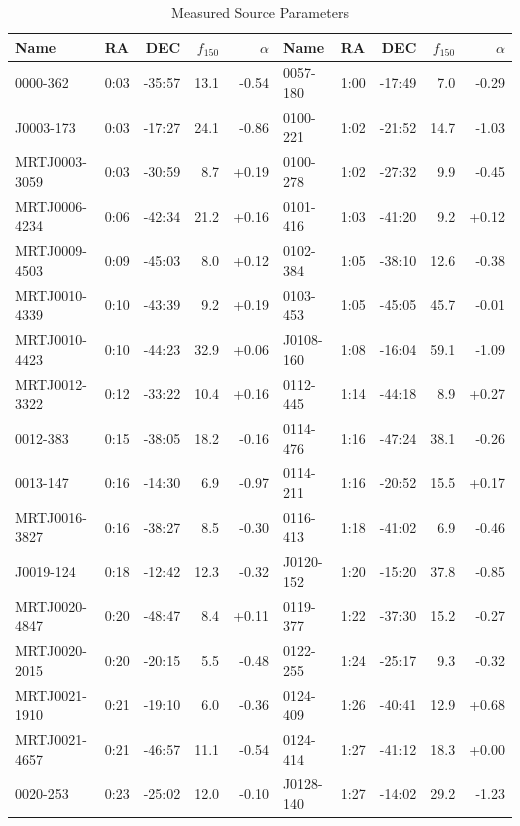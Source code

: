 \documentclass[preprint]{aastex}
\begin{document}
\begin{table}[ht]
\caption{Measured Source Parameters}
\begin{tabular}{l|lrrr||l|lrrr}
\hline
Name & RA & DEC & $f_{150}$ & $\alpha$ & Name & RA & DEC & $f_{150}$ & $\alpha$
\\
\hline
  0000-362 &  0:03 & -35:57 &   13.1 & -0.54 &   0057-180 &  1:00 & -17:49 &    7.0 & -0.29 \\
 J0003-173 &  0:03 & -17:27 &   24.1 & -0.86 &   0100-221 &  1:02 & -21:52 &   14.7 & -1.03 \\
MRTJ0003-3059 &  0:03 & -30:59 &    8.7 & +0.19 &   0100-278 &  1:02 & -27:32 &    9.9 & -0.45 \\
MRTJ0006-4234 &  0:06 & -42:34 &   21.2 & +0.16 &   0101-416 &  1:03 & -41:20 &    9.2 & +0.12 \\
MRTJ0009-4503 &  0:09 & -45:03 &    8.0 & +0.12 &   0102-384 &  1:05 & -38:10 &   12.6 & -0.38 \\
MRTJ0010-4339 &  0:10 & -43:39 &    9.2 & +0.19 &   0103-453 &  1:05 & -45:05 &   45.7 & -0.01 \\
MRTJ0010-4423 &  0:10 & -44:23 &   32.9 & +0.06 &  J0108-160 &  1:08 & -16:04 &   59.1 & -1.09 \\
MRTJ0012-3322 &  0:12 & -33:22 &   10.4 & +0.16 &   0112-445 &  1:14 & -44:18 &    8.9 & +0.27 \\
  0012-383 &  0:15 & -38:05 &   18.2 & -0.16 &   0114-476 &  1:16 & -47:24 &   38.1 & -0.26 \\
  0013-147 &  0:16 & -14:30 &    6.9 & -0.97 &   0114-211 &  1:16 & -20:52 &   15.5 & +0.17 \\
MRTJ0016-3827 &  0:16 & -38:27 &    8.5 & -0.30 &   0116-413 &  1:18 & -41:02 &    6.9 & -0.46 \\
 J0019-124 &  0:18 & -12:42 &   12.3 & -0.32 &  J0120-152 &  1:20 & -15:20 &   37.8 & -0.85 \\
MRTJ0020-4847 &  0:20 & -48:47 &    8.4 & +0.11 &   0119-377 &  1:22 & -37:30 &   15.2 & -0.27 \\
MRTJ0020-2015 &  0:20 & -20:15 &    5.5 & -0.48 &   0122-255 &  1:24 & -25:17 &    9.3 & -0.32 \\
MRTJ0021-1910 &  0:21 & -19:10 &    6.0 & -0.36 &   0124-409 &  1:26 & -40:41 &   12.9 & +0.68 \\
MRTJ0021-4657 &  0:21 & -46:57 &   11.1 & -0.54 &   0124-414 &  1:27 & -41:12 &   18.3 & +0.00 \\
  0020-253 &  0:23 & -25:02 &   12.0 & -0.10 &  J0128-140 &  1:27 & -14:02 &   29.2 & -1.23 \\

\end{tabular}
\end{table}
\end{document}
